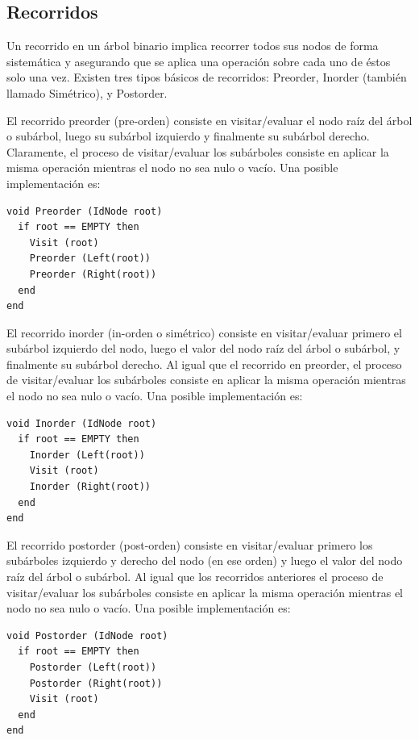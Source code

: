 \subsection{Recorridos}

Un recorrido en un árbol binario implica recorrer todos sus nodos de forma sistemática y asegurando que se aplica una operación sobre cada uno de éstos solo una vez. Existen tres tipos básicos de recorridos: Preorder, Inorder (también llamado Simétrico), y Postorder.

El recorrido preorder (pre-orden) consiste en visitar/evaluar el nodo raíz del árbol o subárbol, luego su subárbol izquierdo y finalmente su subárbol derecho. Claramente, el proceso de visitar/evaluar los subárboles consiste en aplicar la misma operación mientras el nodo no sea nulo o vacío. Una posible implementación es:

\begin{lstlisting}[upquote=true, language=pseudo]
void Preorder (IdNode root)
  if root == EMPTY then
    Visit (root)
    Preorder (Left(root))
    Preorder (Right(root))
  end
end
\end{lstlisting}

El recorrido inorder (in-orden o simétrico) consiste en visitar/evaluar primero el subárbol izquierdo del nodo, luego el valor del nodo raíz del árbol o subárbol, y finalmente su subárbol derecho. Al igual que el recorrido en preorder, el proceso de visitar/evaluar los subárboles consiste en aplicar la misma operación mientras el nodo no sea nulo o vacío. Una posible implementación es:

\begin{lstlisting}[upquote=true, language=pseudo]
void Inorder (IdNode root)
  if root == EMPTY then
    Inorder (Left(root))
    Visit (root)
    Inorder (Right(root))
  end
end
\end{lstlisting}

El recorrido postorder (post-orden) consiste en visitar/evaluar primero los subárboles izquierdo y derecho del nodo (en ese orden) y luego el valor del nodo raíz del árbol o subárbol. Al igual que los recorridos anteriores el proceso de visitar/evaluar los subárboles consiste en aplicar la misma operación mientras el nodo no sea nulo o vacío. Una posible implementación es:

\begin{lstlisting}[upquote=true, language=pseudo]
void Postorder (IdNode root)
  if root == EMPTY then
    Postorder (Left(root))
    Postorder (Right(root))
    Visit (root)
  end
end
\end{lstlisting}

